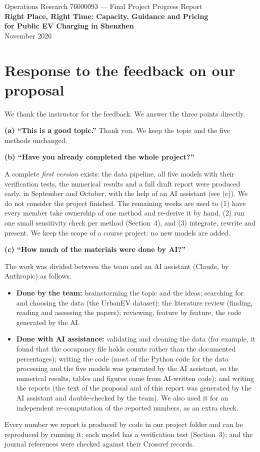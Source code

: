 \documentclass[11pt,a4paper]{article}
\newcommand{\answer}[1]{\par\smallskip\noindent\colorbox{boxc}{\parbox{\dimexpr\linewidth-2\fboxsep}{#1}}\par\smallskip}
\begin{document}
\begin{center}
{\large Operations Research 76000093 --- Final Project Progress Report}\\[6pt]
{\LARGE\bfseries Right Place, Right Time: Capacity, Guidance and Pricing\\[2pt] for Public EV Charging in Shenzhen}\\[8pt]
\TeamNames{} November 2026
\end{center}

\section{Response to the feedback on our proposal}
We thank the instructor for the feedback. We answer the three points directly.

\textbf{(a) ``This is a good topic.''} Thank you. We keep the topic and the five methods unchanged.

\textbf{(b) ``Have you already completed the whole project?''}
\answer{A complete \emph{first version} exists: the data pipeline, all five models with their verification tests, the numerical results and a full draft report were produced early, in September and October, with the help of an AI assistant (see (c)). We do not consider the project finished. The remaining weeks are used to (1) have every member take ownership of one method and re-derive it by hand, (2) run one small sensitivity check per method (Section~4), and (3) integrate, rewrite and present. We keep the scope of a course project: no new models are added.}

\textbf{(c) ``How much of the materials were done by AI?''}
\answer{The work was divided between the team and an AI assistant (Claude, by Anthropic) as follows.
\begin{itemize}[leftmargin=1.3em,itemsep=0pt,topsep=2pt]
\item \textbf{Done by the team:} brainstorming the topic and the ideas; searching for and choosing the data (the UrbanEV dataset); the literature review (finding, reading and assessing the papers); reviewing, feature by feature, the code generated by the AI.
\item \textbf{Done with AI assistance:} validating and cleaning the data (for example, it found that the occupancy file holds counts rather than the documented percentages); writing the code (most of the Python code for the data processing and the five models was generated by the AI assistant, so the numerical results, tables and figures come from AI-written code); and writing the reports (the text of the proposal and of this report was generated by the AI assistant and double-checked by the team). We also used it for an independent re-computation of the reported numbers, as an extra check.
\end{itemize}
Every number we report is produced by code in our project folder and can be reproduced by running it; each model has a verification test (Section~3); and the journal references were checked against their Crossref records.}
\end{document}
